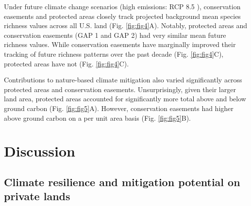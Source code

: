 \documentclass[3p]{elsarticle} %
\begin{document}
Under future climate change scenarios (high emissions: RCP 8.5
\cite{Lawler2020b}), conservation easements and protected areas closely
track projected background mean species richness values across all U.S.
land (Fig. \ref{fig:fig4}A). Notably, protected areas and conservation
easements (GAP 1 and GAP 2) had very similar mean future richness
values. While conservation easements have marginally improved their
tracking of future richness patterns over the past decade (Fig.
\ref{fig:fig4}C), protected areas have not (Fig. \ref{fig:fig4}C).

Contributions to nature-based climate mitigation also varied
significantly across protected areas and conservation easements.
Unsurprisingly, given their larger land area, protected areas accounted
for significantly more total above and below ground carbon (Fig.
\ref{fig:fig5}A). However, conservation easements had higher above
ground carbon on a per unit area basis (Fig. \ref{fig:fig5}B).

\hypertarget{discussion}{%
\section{Discussion}\label{discussion}}

\hypertarget{climate-resilience-and-mitigation-potential-on-private-lands}{%
\subsection{Climate resilience and mitigation potential on private
lands}\label{climate-resilience-and-mitigation-potential-on-private-lands}}
\end{document}
